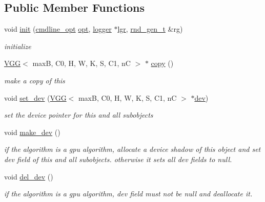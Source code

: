 \subsection*{Public Member Functions}
\begin{DoxyCompactItemize}
\item 
void \hyperlink{structVGG_aa8700968e0ee177cf7f129b2d46231fd}{init} (\hyperlink{structcmdline__opt}{cmdline\+\_\+opt} \hyperlink{structVGG_ad161d19c0d519768f32deca8dfd0598b}{opt}, \hyperlink{structlogger}{logger} $\ast$\hyperlink{structVGG_a5a8069856b54deb20f0b45e4522d9e4a}{lgr}, \hyperlink{structrnd__gen__t}{rnd\+\_\+gen\+\_\+t} \&rg)
\begin{DoxyCompactList}\small\item\em initialize \end{DoxyCompactList}\item 
\hyperlink{structVGG}{V\+GG}$<$ maxB, C0, H, W, K, S, C1, nC $>$ $\ast$ \hyperlink{structVGG_a671e3b02b9a8e55c274f7863a116af30}{copy} ()
\begin{DoxyCompactList}\small\item\em make a copy of this \end{DoxyCompactList}\item 
void \hyperlink{structVGG_a07e0570fe0eb7152dee4eff0c0bcc86f}{set\+\_\+dev} (\hyperlink{structVGG}{V\+GG}$<$ maxB, C0, H, W, K, S, C1, nC $>$ $\ast$\hyperlink{structVGG_acb66854790b4211ec6964690dcaba67b}{dev})
\begin{DoxyCompactList}\small\item\em set the device pointer for this and all subobjects \end{DoxyCompactList}\item 
void \hyperlink{structVGG_a26e977db7cff56b6bd9e2a8183635551}{make\+\_\+dev} ()
\begin{DoxyCompactList}\small\item\em if the algorithm is a gpu algorithm, allocate a device shadow of this object and set dev field of this and all subobjects. otherwise it sets all dev fields to null. \end{DoxyCompactList}\item 
void \hyperlink{structVGG_ab3bcd5bb62b66713f5bf0ba3c8b539cb}{del\+\_\+dev} ()
\begin{DoxyCompactList}\small\item\em if the algorithm is a gpu algorithm, dev field must not be null and deallocate it. \end{DoxyCompactList}\item 

\end{DoxyCompactItemize}
